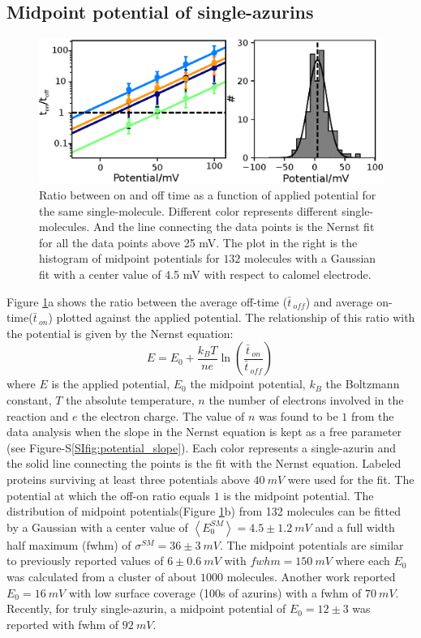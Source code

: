 \documentclass[journal=jacsat,manuscript=article]{achemso}
\newcommand*\me[1]{\ensuremath{\bar{#1}\,}}
\begin{document}
\subsection{Midpoint potential of single-azurins}
\begin{figure}
	\centering
	\includegraphics[]{Figure_2_midpoint.eps}
	\caption{Ratio between on and off time as a function of applied potential for the same single-molecule. Different color represents different single-molecules. And the line connecting the data points is the Nernst fit for all the data points above 25 mV. The plot in the right is the histogram of midpoint potentials for $132$ molecules with a Gaussian fit with a center value of 4.5 mV with respect to calomel electrode.}
	\label{fig:midpoint}
\end{figure}
Figure \ref{fig:midpoint}a shows the ratio between the average off-time ($\me{t}_{off}$) and average on-time($\me{t}_{on}$) plotted against the applied potential. The relationship of this ratio with the potential is given by the Nernst equation: 
\begin{equation}
	E = E_0 + \frac{k_BT}{n e}\ln\left(\frac{\me{t}_{on}}{\me{t}_{off}}\right)\,
	\label{eq:nernst}
\end{equation}
where $E$ is the applied potential, $E_0$ the midpoint potential, $k_B$ the Boltzmann constant, $T$ the absolute temperature, $n$ the number of electrons involved in the reaction and $e$ the electron charge. The value of $n$ was found to be $1$ from the data analysis when the slope in the Nernst equation is kept as a free parameter (see Figure-S\ref{SIfig:potential_slope}). Each color represents a single-azurin and the solid line connecting the points is the fit with the Nernst equation. Labeled proteins surviving at least three potentials above $40~mV$ were used for the fit. The potential at which the off-on ratio equals $1$ is the midpoint potential. The distribution of midpoint potentials(Figure \ref{fig:midpoint}b) from 132 molecules can be fitted by a Gaussian with a center value of $\left<E_0^{SM}\right>=4.5 \pm 1.2~mV$ and a full width half maximum (fwhm) of $\sigma^{SM}=36 \pm 3~mV$. The midpoint potentials are similar to previously reported values of $6\pm0.6~mV$ with $fwhm=150~mV$ where each $E_0$ was calculated from a cluster of about $1000$ molecules.\cite{davis2006monitoring} Another work reported $E_0 = 16~mV$ with low surface coverage (100s of azurins) with a fwhm of $70~mV$.\cite{salverda2010fluorescent} Recently, for truly single-azurin, a midpoint potential of $E_0=12\pm3$ was reported with fwhm of $92~mV$.\cite{akkilic2014chemically-induced}\\
\end{document}
